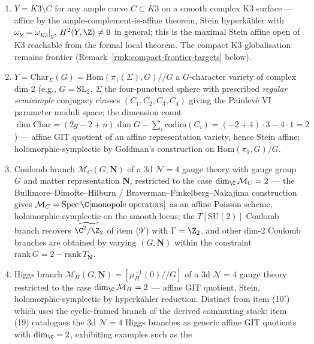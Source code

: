 \begin{cor}
\begin{enumerate}[label=\textup{(\arabic*)},resume]
  \item \(Y=K3\setminus C\) for any ample curve $C\subset K3$ on a
        smooth complex K3 surface --- affine by the
        ample-complement-is-affine theorem, Stein hyperkähler with
        $\omega_Y=\omega_{K3}|_Y$, $H^2(Y,\Z)\neq 0$ in general; this
        is the maximal Stein affine open of K3 reachable from the
        formal local theorem.  The compact K3 globalisation remains
        frontier (Remark~\ref{rmk:compact-frontier-targets} below).
  \item \(Y=\mathrm{Char}_\Sigma(G)=\mathrm{Hom}(\pi_1(\Sigma),G)/\!/G\)
        a $G$-character variety of complex dim 2 (e.g.,
        $G=\mathrm{SL}_2$, $\Sigma$ the four-punctured sphere
        with prescribed \emph{regular semisimple} conjugacy classes
        $(C_1,C_2,C_3,C_4)$ giving the Painlevé VI parameter moduli
        space; the dimension count
        $\dim\mathrm{Char}=(2g-2+n)\dim G-\sum_i\mathrm{codim}(C_i)=
        (-2+4)\cdot 3-4\cdot 1=2$) --- affine GIT quotient of an
        affine representation variety, hence Stein affine;
        holomorphic-symplectic by Goldman's construction on
        $\mathrm{Hom}(\pi_1,G)/G$.
  \item Coulomb branch \(\mathcal M_C(G,\mathbf N)\) of a 3d
        $\mathcal N=4$ gauge theory with gauge group $G$ and matter
        representation $\mathbf N$, restricted to the case
        $\dim_\C\mathcal M_C=2$ --- the
        Bullimore--Dimofte--Hilburn /
        Braverman--Finkelberg--Nakajima construction gives
        $\mathcal M_C=\mathrm{Spec}\,\C[\text{monopole operators}]$ as
        an affine Poisson scheme, holomorphic-symplectic on the smooth
        locus; the $T[\mathrm{SU}(2)]$ Coulomb branch recovers
        $\widetilde{\C^2/\Z_2}$ of item (9$'$) with $\Gamma=\Z_2$, and
        other dim-2 Coulomb branches are obtained by varying
        $(G,\mathbf N)$ within the constraint
        $\mathrm{rank}\,G=2-\mathrm{rank}\,T_{\mathbf N}$.
  \item Higgs branch
        \(\mathcal M_H(G,\mathbf N)=[\mu_H^{-1}(0)/\!/G]\) of a 3d
        $\mathcal N=4$ gauge theory restricted to the case
        $\dim_\C\mathcal M_H=2$ --- affine GIT quotient, Stein,
        holomorphic-symplectic by hyperkähler reduction.  Distinct
        from item (10$'$) which uses the cyclic-framed branch of the
        derived commuting stack: item (19) catalogues the 3d
        $\mathcal N=4$ Higgs branches as generic affine GIT
        quotients with $\dim_\C=2$, exhibiting examples such as the

\end{enumerate}
\end{cor}
